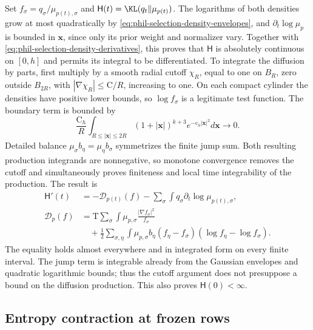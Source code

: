 Set \(f_\sigma=q_\sigma/\mu_{p(t),\sigma}\) and
\(\mathsf H(t)=\KL(q_t\Vert\mu_{p(t)})\).
The logarithms of both densities grow at most quadratically by
\cref{eq:phil-selection-density-envelopes}, and
\(\partial_t\log\mu_p\) is bounded in \(\mathbf x\), since only its prior
weight and normalizer vary. Together with
\cref{eq:phil-selection-density-derivatives}, this proves that
\(\mathsf H\) is absolutely continuous on \([0,h]\) and permits its
integral to be differentiated.
To integrate the diffusion by parts, first multiply by a smooth radial
cutoff \(\chi_R\), equal to one on \(B_R\), zero outside \(B_{2R}\),
with \(|\nabla\chi_R|\le\mathrm C/R\), increasing to one.
On each compact cylinder the densities have positive lower bounds, so
\(\log f_\sigma\) is a legitimate test function. The boundary term is
bounded by
\[
 \frac{\mathrm C_h}{R}\int_{R\le|\mathbf x|\le2R}
       (1+|\mathbf x|)^{k+3}e^{-\mathrm c_h|\mathbf x|^2}d\mathbf x
 \longrightarrow0.
\]
Detailed balance \(\mu_\sigma b_\eta=\mu_\eta b_\sigma\) symmetrizes the
finite jump sum. Both resulting production integrands are nonnegative,
so monotone convergence removes the cutoff and simultaneously proves
finiteness and local time integrability of the production. The result is
\begin{equation}
 \begin{aligned}
 \mathsf H'(t)&=-\mathscr D_{p(t)}(f)
               -\sum_\sigma\int q_\sigma\partial_t\log\mu_{p(t),\sigma},\\
 \mathscr D_p(f)&=\mathrm T\sum_\sigma\int\mu_{p,\sigma}
                         \frac{|\nabla f_\sigma|^2}{f_\sigma}\\
 &\quad+\frac12\sum_{\sigma,\eta}\int\mu_{p,\sigma}b_\eta
                  (f_\eta-f_\sigma)(\log f_\eta-\log f_\sigma).
 \end{aligned}
\label{eq:phil-selection-entropy-identity}
\end{equation}
The equality holds almost everywhere and in integrated form on every finite
interval. The jump term is integrable already from the Gaussian envelopes
and quadratic logarithmic bounds; thus the cutoff argument does not
presuppose a bound on the diffusion production. This also proves
\(\mathsf H(0)<\infty\).

\subsection*{Entropy contraction at frozen rows}

